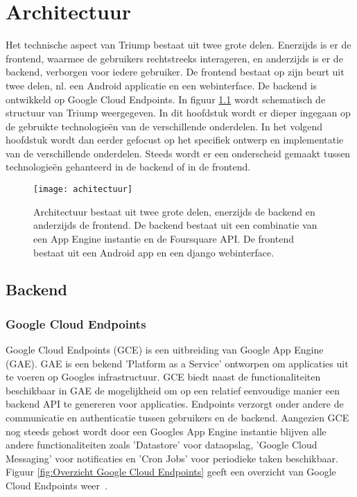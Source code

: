 
\chapter{Architectuur}

Het technische aspect van Triump bestaat uit twee grote delen. Enerzijds is er de frontend, waarmee de gebruikers rechtstreeks interageren, en anderzijds is er de backend, verborgen voor iedere gebruiker. De frontend bestaat op zijn beurt uit twee delen, nl. een Android applicatie en een webinterface. De backend is ontwikkeld op Google Cloud Endpoints. In figuur \ref{fig:algemene structuur} wordt schematisch de structuur van Triump weergegeven. In dit hoofdstuk wordt er dieper ingegaan op de gebruikte technologieën van de verschillende onderdelen. In het volgend hoofdstuk wordt dan eerder gefocust op het specifiek ontwerp en implementatie van de verschillende onderdelen. Steeds wordt er een onderscheid gemaakt tussen technologieën gehanteerd in de backend of in de frontend.

\begin{figure}[H]
	\centering
	\texttt{[image: achitectuur]}
	\caption{Architectuur bestaat uit twee grote delen, enerzijds de backend en anderzijds de frontend. De backend bestaat uit een combinatie van een App Engine instantie en de Foursquare API. De frontend bestaat uit een Android app en een django webinterface.}
	\label{fig:algemene structuur}
	
\end{figure}

\section{Backend}

\subsection{Google Cloud Endpoints}
\label{sec: GCE}
Google Cloud Endpoints (GCE) is een uitbreiding van Google App Engine (GAE). GAE is een bekend 'Platform as a Service' ontworpen om applicaties uit te voeren op Googles infrastructuur. GCE biedt naast de functionaliteiten beschikbaar in GAE de mogelijkheid om op een relatief eenvoudige manier een backend API te genereren voor applicaties.  Endpoints verzorgt onder andere de communicatie en authenticatie tussen gebruikers en de backend.
Aangezien GCE nog steeds gehost wordt door een Googles App Engine instantie blijven alle andere functionaliteiten zoals 'Datastore' voor dataopslag, 'Google Cloud Messaging' voor notificaties en 'Cron Jobs' voor periodieke taken beschikbaar. Figuur \ref{fig:Overzicht Google Cloud Endpoints} geeft een overzicht van Google Cloud Endpoints weer~\cite{Google_endpoints}.

